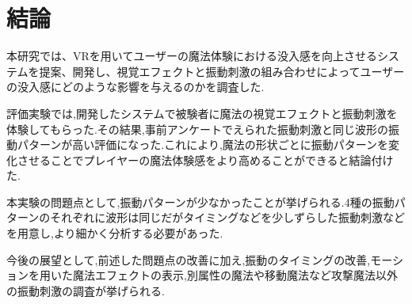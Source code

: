 \chapter{結論}
本研究では、VRを用いてユーザーの魔法体験における没入感を向上させるシステムを提案、開発し、視覚エフェクトと振動刺激の組み合わせによってユーザーの没入感にどのような影響を与えるのかを調査した.

評価実験では,開発したシステムで被験者に魔法の視覚エフェクトと振動刺激を体験してもらった.その結果,事前アンケートでえられた振動刺激と同じ波形の振動パターンが高い評価になった.これにより,魔法の形状ごとに振動パターンを変化させることでプレイヤーの魔法体験感をより高めることができると結論付けた.

本実験の問題点として,振動パターンが少なかったことが挙げられる.4種の振動パターンのそれぞれに波形は同じだがタイミングなどを少しずらした振動刺激などを用意し,より細かく分析する必要があった.

今後の展望として,前述した問題点の改善に加え,振動のタイミングの改善,モーションを用いた魔法エフェクトの表示,別属性の魔法や移動魔法など攻撃魔法以外の振動刺激の調査が挙げられる.


\begin{comment}
    \textblockcolour{pink}
    \begin{textblock}{4}(16, 1)
        【5】本文はここまで
    \end{textblock}
    
    \begin{textblock}{7}(11, 28)
        本文は20ページ以上を目安とする。
    \end{textblock}
\end{comment}
  